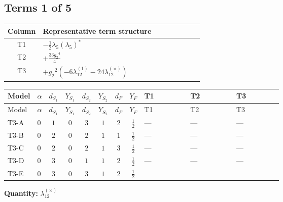 \documentclass[8pt]{article}
\begin{document}
\begin{landscape}
\subsection*{Terms 1 of 5}
\begin{center}
\begin{tabular}{@{}c >{\raggedright\arraybackslash}p{0.82\linewidth}@{}}
\toprule
Column & Representative term structure \\
\midrule
T1 & \(\displaystyle -\frac{1}{2} {\lambda_5} \left({\lambda_5}\right)^{*}\) \\
\midrule
T2 & \(\displaystyle +\frac{33 {g_2}^4}{4}\) \\
\midrule
T3 & \(\displaystyle +{g_2}^2 (-6 {\lambda_{12}^{(1)}}-24 {\lambda_{12}^{(\times)}})\) \\
\midrule
\bottomrule
\end{tabular}
\end{center}
\smallskip
\tiny
\begin{longtable}{@{}llcccccc >{\raggedright\arraybackslash}p{0.21\linewidth} >{\raggedright\arraybackslash}p{0.21\linewidth} >{\raggedright\arraybackslash}p{0.21\linewidth}@{}}
\toprule
Model & $\alpha$ & $d_{S_1}$ & $Y_{S_1}$ & $d_{S_2}$ & $Y_{S_2}$ & $d_F$ & $Y_F$ & T1 & T2 & T3 \\
\midrule
\endfirsthead
\toprule
Model & $\alpha$ & $d_{S_1}$ & $Y_{S_1}$ & $d_{S_2}$ & $Y_{S_2}$ & $d_F$ & $Y_F$ & T1 & T2 & T3 \\
\midrule
\endhead
T3-A & $0$ & $1$ & $0$ & $3$ & $1$ & $2$ & $\frac{1}{2}$ & --- & --- & --- \\
\midrule
T3-B & $0$ & $2$ & $0$ & $2$ & $1$ & $1$ & $\frac{1}{2}$ & --- & --- & --- \\
\midrule
T3-C & $0$ & $2$ & $0$ & $2$ & $1$ & $3$ & $\frac{1}{2}$ & --- & --- & --- \\
\midrule
T3-D & $0$ & $3$ & $0$ & $1$ & $1$ & $2$ & $\frac{1}{2}$ & --- & --- & --- \\
\midrule
T3-E & $0$ & $3$ & $0$ & $3$ & $1$ & $2$ & $\frac{1}{2}$ & \scriptsize\adjustbox{max width=\linewidth}{$\begin{gathered} -\frac{1}{2} {\lambda_5} \left({\lambda_5}\right)^{*}\end{gathered}$} & \scriptsize\adjustbox{max width=\linewidth}{$\begin{gathered} +\frac{33 {g_2}^4}{4}\end{gathered}$} & \scriptsize\adjustbox{max width=\linewidth}{$\begin{gathered} +{g_2}^2 (-6 {\lambda_{12}^{(1)}}-24 {\lambda_{12}^{(\times)}})\end{gathered}$} \\
\midrule
\bottomrule
\end{longtable}
\clearpage
\noindent\textbf{Quantity: }$\lambda_{12}^{(\times)}$\par\smallskip

\end{landscape}
\end{document}
